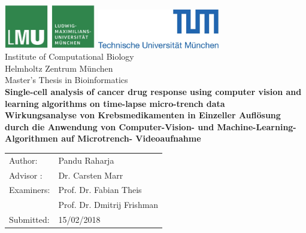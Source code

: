 \documentclass[pdftex,12pt,a4paper]{report}
\begin{document}
\begin{titlepage}
{\sffamily


\begin{center}
\includegraphics[width=0.3\textwidth]{logo2.jpg}
\hfill
\includegraphics[width=0.4\textwidth]{logo1.jpg}  
\\[1.5cm]  

{\Large Institute of Computational Biology}\\[0.5cm]
{\Large Helmholtz Zentrum M\"unchen}\\[1cm]


{\Large Master's Thesis in Bioinformatics}\\[2cm]
{\textbf{\Large Single-cell analysis of cancer drug response using computer vision and learning algorithms on time-lapse micro-trench data}}\\[2cm]
{\textbf{\Large Wirkungsanalyse von Krebsmedikamenten in Einzeller Aufl\"osung durch die Anwendung von Computer-Vision- und Machine-Learning-Algorithmen auf Microtrench- Videoaufnahme}}\\[4cm]

\end{center}
\begin{center}\Large
  \begin{tabular}{ll}
    Author:& Pandu Raharja\\
    Advisor : &  Dr. Carsten Marr\\
    Examiners: &  Prof. Dr. Fabian Theis\\
    & Prof. Dr. Dmitrij Frishman\\
    Submitted:     &  15/02/2018
  \end{tabular}
\end{center}

}%

\end{titlepage}
\end{document}
